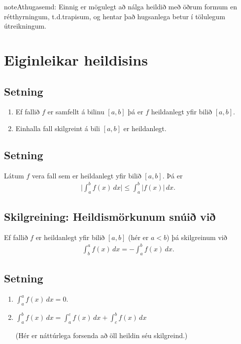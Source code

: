 \documentclass[a4paper,10pt,icelandic]{sphinxmanual}
\begin{document}
\begin{notice}{note}{Athugasemd:}
Einnig er mögulegt að nálga heildið með öðrum formum en rétthyrningum,
t.d.trapisum, og hentar það hugsanlega betur í
tölulegum útreikningum.
\end{notice}


\section{Eiginleikar heildisins}
\label{kafli06:eiginleikar-heildisins}

\subsection{Setning}
\label{kafli06:setning}\begin{enumerate}
\item {} 
Ef fallið \(f\) er samfellt á bilinu \([a, b]\) þá er
\(f\) heildanlegt yfir bilið \([a, b]\).

\item {} 
Einhalla fall skilgreint á bili \([a,b]\) er heildanlegt.

\end{enumerate}


\subsection{Setning}
\label{kafli06:id2}
Látum \(f\) vera fall sem er heildanlegt yfir bilið \([a, b]\).
Þá er
\begin{equation*}
\begin{split}\Big|\int_a^b f(x)\,dx\Big|\leq \int_a^b |f(x)|\,dx.\end{split}
\end{equation*}

\subsection{Skilgreining: Heildismörkunum snúið við}
\label{kafli06:skilgreining-heildismorkunum-snui-vi}
Ef fallið \(f\) er heildanlegt yfir bilið \([a,b]\) (hér er
\(a<b\)) þá skilgreinum við
\begin{equation*}
\begin{split}\int_b^a f(x)\,dx=-\int_a^b f(x)\,dx.\end{split}
\end{equation*}

\subsection{Setning}
\label{kafli06:id3}\begin{enumerate}
\item {} 
\(\int_a^a f(x)\,dx=0\).

\item {} 
\(\int_a^b f(x)\,dx=\int_a^c f(x)\,dx+\int_c^b f(x)\,dx\)

(Hér er náttúrlega forsenda að öll heildin séu skilgreind.)

\end{enumerate}
\end{document}
